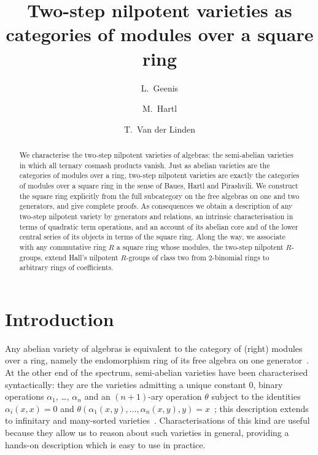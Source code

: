\documentclass[reqno,a4paper]{amsart}
\title[Two-step nilpotent varieties and square rings]{Two-step nilpotent varieties as\\ categories of modules over a square ring}
\author{L.~Geenis}
\author{M.~Hartl}
\author{T.~Van der Linden}
\date{}
\theoremstyle{plain}
\theoremstyle{definition}
\begin{document}
\begin{abstract}
  We characterise the two-step nilpotent varieties of algebras: the semi-abelian varieties in which all ternary cosmash products vanish. Just as abelian varieties are the categories of modules over a ring, two-step nilpotent varieties are exactly the categories of modules over a square ring in the sense of Baues, Hartl and Pirashvili. We construct the square ring explicitly from the full subcategory on the free algebras on one and two generators, and give complete proofs. As consequences we obtain a description of any two-step nilpotent variety by generators and relations, an intrinsic characterisation in terms of quadratic term operations, and an account of its abelian core and of the lower central series of its objects in terms of the square ring. Along the way, we associate with any commutative ring \(R\) a square ring whose modules, the two-step nilpotent \(R\)-groups, extend Hall's nilpotent \(R\)-groups of class two from \(2\)-binomial rings to arbitrary rings of coefficients.
\end{abstract}

\maketitle

\section*{Introduction}

Any abelian variety of algebras is equivalent to the category of (right) modules over a ring, namely the endomorphism ring of its free algebra on one generator~\cite{Freyd}. At the other end of the spectrum, semi-abelian varieties have been characterised syntactically: they are the varieties admitting a unique constant \(0\), binary operations \(\alpha_{1}\), \dots, \(\alpha_{n}\) and an \((n+1)\)-ary operation \(\theta\) subject to the identities \(\alpha_{i}(x,x)=0\) and \(\theta(\alpha_{1}(x,y),\dots,\alpha_{n}(x,y),y)=x\)~\cite{BoJa}; this description extends to infinitary and many-sorted varieties~\cite{Gran-Rosicky:Monadic}. Characterisations of this kind are useful because they allow us to reason about such varieties in general, providing a hands-on description which is easy to use in practice.
\end{document}
